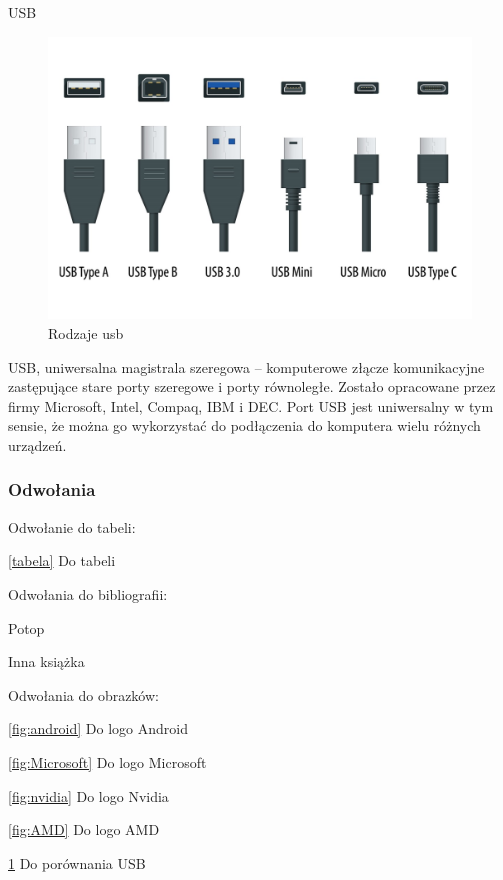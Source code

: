 \documentclass[aspectratio=169,xcolor=dvipsnames, t]{beamer}
\begin{document}
\begin{frame}{USB}
    \begin{figure}
    \centering
    \includegraphics[width=0.9\linewidth]{usb.png}
    \caption{Rodzaje usb}
    \label{fig:usb}
\end{figure}
USB, uniwersalna magistrala szeregowa – komputerowe złącze komunikacyjne zastępujące stare porty szeregowe i porty równoległe. Zostało opracowane przez firmy Microsoft, Intel, Compaq, IBM i DEC. Port USB jest uniwersalny w tym sensie, że można go wykorzystać do podłączenia do komputera wielu różnych urządzeń.
\end{frame}




\begin{frame}[fragile] 
    \frametitle{Odwołania}
    Odwołanie do tabeli:
    
    \ref{tabela} Do tabeli
\hfill \break

    Odwołania do bibliografii:
    
    \cite{book1} Potop
    
    \cite{book2} Inna książka
    
\hfill \break   
    Odwołania do obrazków:
    
    \ref{fig:android} Do logo Android
       
    \ref{fig:Microsoft} Do logo Microsoft
    
    \ref{fig:nvidia} Do logo Nvidia

    \ref{fig:AMD} Do logo AMD
    
    \ref{fig:usb} Do porównania USB
\end{frame}
\end{document}
